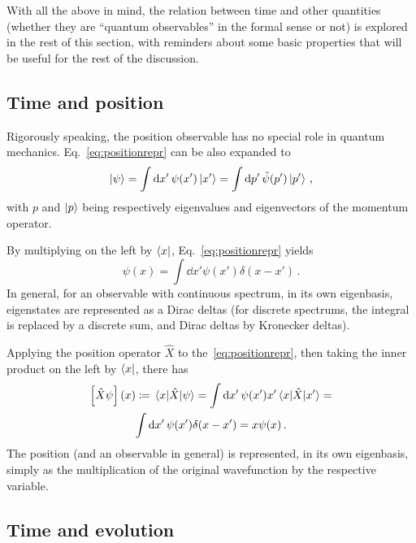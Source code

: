 With all the above in mind, the relation between time and other quantities
(whether they are ``quantum observables'' in the formal sense or not)
is explored in the rest of this section,
with reminders about some basic properties that will be useful for the rest of the
discussion.

\subsection{Time and position}

Rigorously speaking, the position observable has no special role in quantum mechanics.
Eq.~\eqref{eq:positionrepr} can be also expanded to
\begin{equation}\label{eq:qprepr}
  \ket{\psi} = \int \dd{x'} \psi(x') \ket{x'} = \int \dd{p'} \tilde{\psi}(p') \ket{p'} \,\text{,}
\end{equation}
with $p$ and $\ket{p}$ being respectively eigenvalues and eigenvectors of the momentum operator.

By multiplying on the left by $\bra{x}$, Eq.~\eqref{eq:positionrepr} yields
\begin{equation}\label{eq:diracdeltax}
  \psi(x) = \int \dd{x'} \psi(x') \delta(x-x') \,\text{.}
\end{equation}
In general, for an observable with continuous spectrum,
in its own eigenbasis, eigenstates are represented as a Dirac deltas
(for discrete spectrums, the integral is replaced by a discrete sum,
and Dirac deltas by Kronecker deltas).

Applying the position operator $\hat{X}$ to the~\eqref{eq:positionrepr},
then taking the inner product on the left by $\bra{x}$,
there has
\begin{multline}
  \qty[\hat{X}\psi](x) \coloneqq \mel{x}{\hat{X}}{\psi} =
    \int \dd{x'} \psi(x') x' \mel{x}{\hat{X}}{x'} = \\
    \int \dd{x'} \psi(x') \delta(x-x') =
    x\psi(x)
  \,\text{.}
\end{multline}
The position
(and an observable in general) is represented, in its own eigenbasis,
simply as the multiplication of the original wavefunction by the respective variable.

\subsection{Time and evolution}

